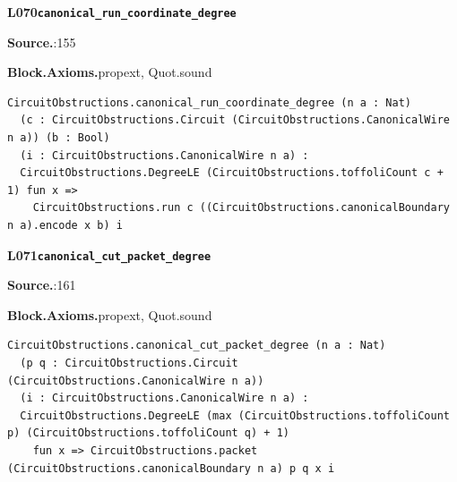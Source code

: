 \par\medskip\noindent\begin{minipage}{\textwidth}
{\small\bfseries L070\enspace\texttt{canonical\_run\_coordinate\_degree}\par}
{\footnotesize\raggedright\textbf{Source.}\enspace{}:155\par
\textbf{Block.}\quad\textbf{Axioms.}\enspace propext, Quot.sound\par}\nopagebreak
\begin{lstlisting}
CircuitObstructions.canonical_run_coordinate_degree (n a : Nat)
  (c : CircuitObstructions.Circuit (CircuitObstructions.CanonicalWire n a)) (b : Bool)
  (i : CircuitObstructions.CanonicalWire n a) :
  CircuitObstructions.DegreeLE (CircuitObstructions.toffoliCount c + 1) fun x =>
    CircuitObstructions.run c ((CircuitObstructions.canonicalBoundary n a).encode x b) i
\end{lstlisting}
\end{minipage}\par

\par\medskip\noindent\begin{minipage}{\textwidth}
{\small\bfseries L071\enspace\texttt{canonical\_cut\_packet\_degree}\par}
{\footnotesize\raggedright\textbf{Source.}\enspace{}:161\par
\textbf{Block.}\quad\textbf{Axioms.}\enspace propext, Quot.sound\par}\nopagebreak
\begin{lstlisting}
CircuitObstructions.canonical_cut_packet_degree (n a : Nat)
  (p q : CircuitObstructions.Circuit (CircuitObstructions.CanonicalWire n a))
  (i : CircuitObstructions.CanonicalWire n a) :
  CircuitObstructions.DegreeLE (max (CircuitObstructions.toffoliCount p) (CircuitObstructions.toffoliCount q) + 1)
    fun x => CircuitObstructions.packet (CircuitObstructions.canonicalBoundary n a) p q x i
\end{lstlisting}
\end{minipage}\par

